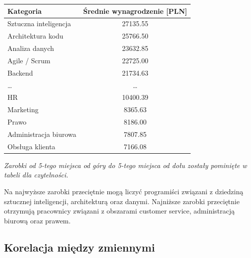 \documentclass{article}
\begin{document}
\begin{table}[H]
    \centering
    \begin{tabular}{|l|c|}
        \hline
        \textbf{Kategoria}    & \textbf{Średnie wynagrodzenie [PLN]} \\ \hline
        Sztuczna inteligencja & 27135.55                             \\ \hline
        Architektura kodu     & 25766.50                             \\ \hline
        Analiza danych        & 23632.85                             \\ \hline
        Agile / Scrum         & 22725.00                             \\ \hline
        Backend               & 21734.63                             \\ \hline
        \dots                 & \dots                                \\ \hline
        HR                    & 10400.39                             \\ \hline
        Marketing             & 8365.63                              \\ \hline
        Prawo                 & 8186.00                              \\ \hline
        Administracja biurowa & 7807.85                              \\ \hline
        Obsługa klienta       & 7166.08                              \\ \hline
    \end{tabular}
\end{table}

\textit{Zarobki od 5-tego miejsca od góry do 5-tego miejsca od dołu zostały pominięte w tabeli dla czytelności.}

\medskip

Na najwyższe zarobki przeciętnie mogą liczyć programiści związani z dziedziną sztucznej inteligencji, architekturą oraz danymi.
Najniższe zarobki przeciętnie otrzymują pracownicy związani z obszarami customer service, administracją biurową oraz prawem.

\subsection{Korelacja między zmiennymi}
\end{document}
